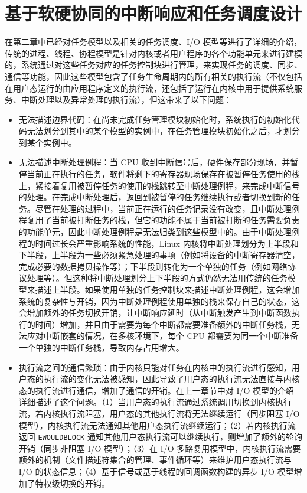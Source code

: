 \chapter{基于软硬协同的中断响应和任务调度设计}

在第二章中已经对任务模型以及相关的任务调度、I/O 模型等进行了详细的介绍，传统的进程、线程、协程模型是针对内核或者用户程序的各个功能单元来进行建模的，系统通过对这些任务对应的任务控制块进行管理，来实现任务的调度、同步、通信等功能，因此这些模型包含了任务生命周期内的所有相关的执行流（不仅包括在用户态运行的由应用程序定义的执行流，还包括了运行在内核中用于提供系统服务、中断处理以及异常处理的执行流），但这带来了以下问题：

\begin{itemize}
    \item 无法描述边界代码：在尚未完成任务管理模块初始化时，系统执行的初始化代码无法划分到其中的某个模型的实例中，在任务管理模块初始化之后，才划分到某个实例中。
    
    \item 无法描述中断处理例程：当 CPU 收到中断信号后，硬件保存部分现场，并暂停当前正在执行的任务，软件将剩下的寄存器现场保存在被暂停任务使用的栈上，紧接着复用被暂停任务的使用的栈跳转至中断处理例程，来完成中断信号的处理。在完成中断处理后，返回到被暂停的任务继续执行或者切换到新的任务。尽管在处理的过程中，当前正在运行的任务记录没有改变，且中断处理例程复用了当前被打断任务的栈，但它的功能不属于当前被打断的任务需要负责的功能单元，因此中断处理例程是无法归类到这些模型中的。由于中断处理例程的时间过长会严重影响系统的性能，Linux 内核将中断处理划分为上半段和下半段，上半段为一些必须紧急处理的事项（例如将设备的中断寄存器清空，完成必要的数据拷贝操作等）；下半段则转化为一个单独的任务（例如网络协议处理等）。但这种将中断处理划分上下半段的方式仍然无法用传统的任务模型来描述上半段。如果使用单独的任务控制块来描述中断处理例程，这会增加系统的复杂性与开销，因为中断处理例程使用单独的栈来保存自己的状态，这会增加额外的任务切换开销，让中断响应延时（从中断触发产生到中断函数执行的时间）增加，并且由于需要为每个中断都需要准备额外的中断任务栈，无法应对中断嵌套的情况，在多核环境下，每个 CPU 都需要为同一个中断准备一个单独的中断任务栈，导致内存占用增大。
        
    \item 执行流之间的通信繁琐：由于内核只能对任务在内核中的执行流进行感知，用户态的执行流的变化无法被感知，因此导致了用户态的执行流无法直接与内核态的执行流进行通信，增加了通信的开销。在上一章节中对 I/O 模型的介绍详细描述了这个问题。（1）当用户态的执行流通过系统调用切换到内核执行流，若内核执行流阻塞，用户态的其他执行流将无法继续运行（同步阻塞 I/O 模型），内核执行流无法通知其他用户态执行流继续运行；（2）若内核执行流返回 \verb|EWOULDBLOCK| 通知其他用户态执行流可以继续执行，则增加了额外的轮询开销（同步非阻塞 I/O 模型）；（3）在 I/O 多路复用模型中，内核执行流需要额外的机制（文件描述符集合的管理、事件循环等）来维护用户态执行流与 I/O 的状态信息；（4）基于信号或基于线程的回调函数构建的异步 I/O 模型增加了特权级切换的开销。
    
\end{itemize}

